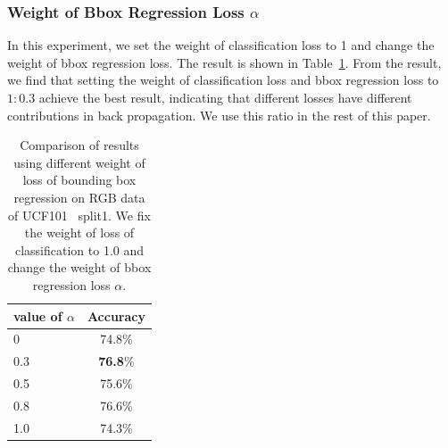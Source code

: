 \documentclass[10pt,twocolumn,letterpaper]{article}
\begin{document}
\subsubsection{Weight of Bbox Regression Loss $\alpha$}
In this experiment, we set the weight of classification loss to 1 and change the weight of bbox regression loss. The result is shown in Table~\ref{table:alpha}. From the result, we find that setting the weight of classification loss and bbox regression loss to $1 : 0.3$ achieve the best result, indicating that different losses have different contributions in back propagation. We use this ratio in the rest of this paper.
\begin{table}
	\begin{center}
		\begin{tabular}{|l|c|}
			\hline
			value of $\alpha$ & Accuracy\\
			\hline												
			0										& 74.8\% \\
			0.3										& \textbf{76.8}\% \\
			0.5										& 75.6\% \\
			0.8										& 76.6\% \\
			1.0										& 74.3\% \\
			\hline
		\end{tabular}
	\end{center}
	\caption{Comparison of results using different weight of loss of bounding box regression on RGB data of UCF101~\cite{soomro2012ucf101} split1. We fix the weight of loss of classification to 1.0 and change the weight of bbox regression loss $\alpha$. }
	\label{table:alpha}
\end{table}
\end{document}
